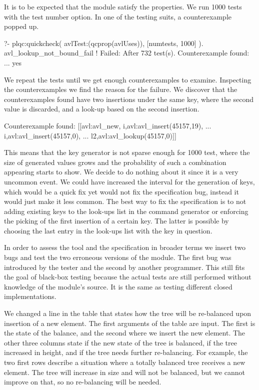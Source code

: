 It is to be expected that the module satisfy the properties.
%
We run 1000 tests with the test number option.
%
In one of the testing suits, a counterexample popped up.
\begin{yapcode}
   ?- plqc:quickcheck(
                avlTest:(qcprop(avlUses)),
                [{numtests, 1000}] ).
 avl_lookup_not_bound_fail
 !
 Failed: After 732 test(s).
 Counterexample found: ...
 yes
\end{yapcode}
%
We repeat the tests until we get enough counterexamples to examine.
%
Inspecting the counterexamples we find the reason for the failure.
%
We discover that the counterexamples found have two insertions under the
same key, where the second value is discarded, and a look-up based on
the second insertion.
%
\begin{yapcode}
 Counterexample found:
   [[avl:avl_new,
     {i,avl:avl_insert(45157,19)},
     ...
     {i,avl:avl_insert(45157,0)},
     ...
     {l2,avl:avl_lookup(45157,0)}]] 
\end{yapcode}
%
This means that the key generator is not sparse enough for 1000 test,
where the size of generated values grows and the probability of such a
combination appearing starts to show.
%
We decide to do nothing about it since it is a very uncommon event.
%
We could have increased the interval for the generation of keys, which
would be a quick fix yet would not fix the specification bug, instead it would just
make it less common.
%
The best way to fix the specification is to not adding existing keys to
the look-ups list in the command generator or enforcing the picking of
the first insertion of a certain key.
%
The latter is possible by choosing the last entry in the look-ups list
with the key in question.


In order to  assess the tool and the specification in broader terms we
insert two bugs and test the two erroneous versions of the module.
%
The first bug was introduced by the tester and the second by another
programmer.
%
This still fits the goal of black-box testing because the actual tests
are still performed without knowledge of the module's source.
%
It is the same as testing different closed implementations.


We changed a line in the table that states how the tree will be
re-balanced upon insertion of a new element.
%
The first arguments of the table are input.
%
The first is the state of the balance, and the second where we insert
the new element.
%
The other three columns state if the new state of the tree is balanced,
if the tree increased in height, and if the tree needs further
re-balancing.
%
For example, the two first rows describe a situation where a totally
balanced tree receives a new element.
%
The tree will increase in size and will not be balanced, but we cannot
improve on that, so no re-balancing will be needed.

